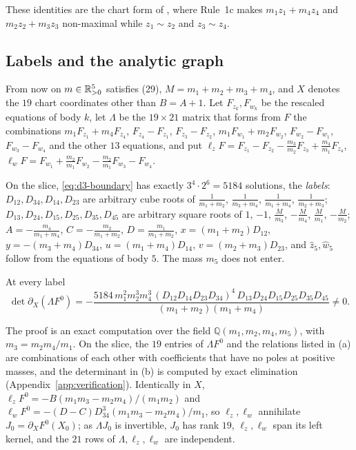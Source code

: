 These identities are the chart form of \cite[\S5.2]{AK}, where Rule~1c makes $m_1z_1+m_4z_4$ and
$m_2z_2+m_3z_3$ non-maximal while $z_1\sim z_2$ and $z_3\sim z_4$.

\subsection{Labels and the analytic graph}
From now on $m\in\mathbb{R}_{>0}^5$ satisfies (29), $M=m_1+m_2+m_3+m_4$, and $X$ denotes the $19$ chart
coordinates other than $B=A+1$.  Let $F_{z_k},F_{w_k}$ be the rescaled equations of body $k$, let
$\Lambda$ be the $19\times21$ matrix that forms from $F$ the combinations $m_1F_{z_1}+m_4F_{z_4}$,
$F_{z_4}-F_{z_1}$, $F_{z_3}-F_{z_2}$, $m_1F_{w_1}+m_2F_{w_2}$, $F_{w_2}-F_{w_1}$,
$F_{w_3}-F_{w_4}$ and the other $13$ equations, and put
$\ell_zF=F_{z_1}-F_{z_2}-\frac{m_3}{m_2}F_{z_3}+\frac{m_4}{m_1}F_{z_4}$,
$\ell_wF=F_{w_1}+\frac{m_2}{m_1}F_{w_2}-\frac{m_2}{m_1}F_{w_3}-F_{w_4}$.

\begin{lemma}\label{lem:d3-fibre}
\begin{alphalist}
  \item On the slice, \eqref{eq:d3-boundary} has exactly $3^4\cdot2^6=5184$ solutions, the
  \emph{labels}: $D_{12},D_{34},D_{14},D_{23}$ are arbitrary cube roots of $\frac1{m_1+m_2}$,
  $\frac1{m_3+m_4}$, $\frac1{m_1+m_4}$, $\frac1{m_2+m_3}$; $D_{13},D_{24},D_{15},D_{25},D_{35},
  D_{45}$ are arbitrary square roots of $1$, $-1$, $\frac M{m_3}$, $-\frac M{m_4}$, $\frac M{m_1}$,
  $-\frac M{m_2}$; $A=-\frac{m_4}{m_1+m_4}$, $C=-\frac{m_2}{m_1+m_2}$, $D=\frac{m_1}{m_1+m_2}$,
  $x=(m_1+m_2)D_{12}$, $y=-(m_3+m_4)D_{34}$, $u=(m_1+m_4)D_{14}$, $v=(m_2+m_3)D_{23}$, and
  $\hat z_5,\hat w_5$ follow from the equations of body $5$.  The mass $m_5$ does not enter.
  \item At every label
  \[
  \det\partial_X(\Lambda F^0)=-\frac{5184\,m_1^2m_2^3m_4^3\,(D_{12}D_{14}D_{23}D_{34})^4\,
  D_{13}D_{24}D_{15}D_{25}D_{35}D_{45}}{(m_1+m_2)(m_1+m_4)}\neq0 .
  \]
\end{alphalist}
\end{lemma}

The proof is an exact computation over the field $\mathbb Q(m_1,m_2,m_4,m_5)$, with
$m_3=m_2m_4/m_1$.  On the slice, the $19$ entries of $\Lambda F^0$ and the relations listed in (a)
are combinations of each other with coefficients that have no poles at positive masses, and the
determinant in (b) is computed by exact elimination (Appendix~\ref{app:verification}).
Identically in $X$, $\ell_zF^0=-B(m_1m_3-m_2m_4)/(m_1m_2)$ and
$\ell_wF^0=-(D-C)D_{34}^3(m_1m_3-m_2m_4)/m_1$, so $\ell_z,\ell_w$ annihilate
$J_0=\partial_XF^0(X_0)$; as $\Lambda J_0$ is invertible, $J_0$ has rank $19$, $\ell_z,\ell_w$ span
its left kernel, and the $21$ rows of $\Lambda,\ell_z,\ell_w$ are independent.

